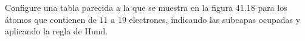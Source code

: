 \item Configure una tabla parecida a la que se muestra en la figura 41.18 para los átomos que contienen de $11$ a $19$ electrones, indicando las subcapas ocupadas y aplicando la regla de Hund.